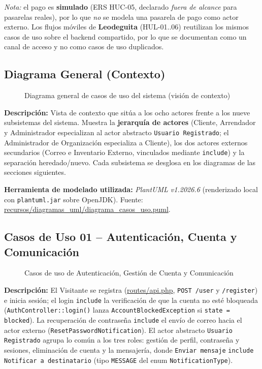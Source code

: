 \noindent\textit{Nota:} el pago es \textbf{simulado} (ERS HUC-05, declarado \textit{fuera de alcance} para pasarelas reales), por lo que \emph{no} se modela una pasarela de pago como actor externo. Los flujos móviles de \textbf{Leodeguita} (HUL-01..06) reutilizan los mismos casos de uso sobre el backend compartido, por lo que se documentan como un canal de acceso y no como casos de uso duplicados.
\clearpage

\subsection{Diagrama General (Contexto)}
\begin{figure}[H]
    \centering
    \caption{Diagrama general de casos de uso del sistema (visión de contexto)}
    \label{fig:casos_uso}
\end{figure}
\noindent\textbf{Descripción:} Vista de contexto que sitúa a los ocho actores frente a los nueve subsistemas del sistema. Muestra la \textbf{jerarquía de actores} (Cliente, Arrendador y Administrador especializan al actor abstracto \texttt{Usuario Registrado}; el Administrador de Organización especializa a Cliente), los dos actores externos secundarios (Correo e Inventario Externo, vinculados mediante \texttt{\guillemotleft include\guillemotright}) y la separación heredado/nuevo. Cada subsistema se desglosa en los diagramas de las secciones siguientes.

\bigskip
{\sloppy\noindent\textbf{Herramienta de modelado utilizada:} \textit{PlantUML v1.2026.6} (renderizado local con \texttt{plantuml.jar} sobre OpenJDK). Fuente: \url{recursos/diagramas_uml/diagrama_casos_uso.puml}.\par}
\clearpage

\subsection{Casos de Uso 01 -- Autenticación, Cuenta y Comunicación}
\begin{figure}[H]
    \centering
    \caption{Casos de uso de Autenticación, Gestión de Cuenta y Comunicación}
    \label{fig:cu01}
\end{figure}
\noindent\textbf{Descripción:} El Visitante se registra (\url{routes/api.php}, \texttt{POST /user} y \texttt{/register}) e inicia sesión; el login \texttt{\guillemotleft include\guillemotright} la verificación de que la cuenta no esté bloqueada (\texttt{AuthController::login()} lanza \texttt{AccountBlockedException} si \texttt{state = blocked}). La recuperación de contraseña \texttt{\guillemotleft include\guillemotright} el envío de correo hacia el actor externo (\texttt{ResetPasswordNotification}). El actor abstracto \texttt{Usuario Registrado} agrupa lo común a los tres roles: gestión de perfil, contraseña y sesiones, eliminación de cuenta y la mensajería, donde \texttt{Enviar mensaje} \texttt{\guillemotleft include\guillemotright} \texttt{Notificar a destinatario} (tipo \texttt{MESSAGE} del enum \texttt{NotificationType}).

